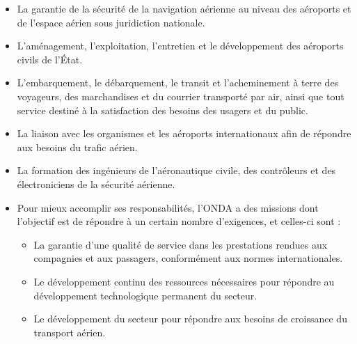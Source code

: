 \documentclass[12pt, a4paper, oneside]{report}
\begin{document}
\begin{itemize}
  \item La garantie de la sécurité de la navigation aérienne au niveau des 
  aéroports et de l’espace aérien sous juridiction nationale.
  \item L’aménagement, l’exploitation, l’entretien et le développement 
  des aéroports civils de l’État.
  \item L’embarquement, le débarquement, le transit et l’acheminement 
  à terre des voyageurs, des marchandises et du courrier transporté par 
  air, ainsi que tout service destiné à la satisfaction des besoins des 
  usagers et du public.
  \item La liaison avec les organismes et les aéroports internationaux 
  afin de répondre aux besoins du trafic aérien.
  \item La formation des ingénieurs de l’aéronautique civile, des contrôleurs 
  et des électroniciens de la sécurité aérienne.
\end{itemize}
\newpage
\begin{itemize}
  \item Pour mieux accomplir ses responsabilités, l’ONDA a des missions dont 
  l’objectif est de répondre à un certain nombre d’exigences, et celles-ci sont :
  \begin{itemize}
    \item La garantie d’une qualité de service dans les prestations rendues 
    aux compagnies et aux passagers, conformément aux normes internationales.
    \item Le développement continu des ressources nécessaires pour répondre 
    au développement technologique permanent du secteur.
    \item Le développement du secteur pour répondre aux besoins de croissance 
    du transport aérien.
  \end{itemize}
\end{itemize}
\end{document}
